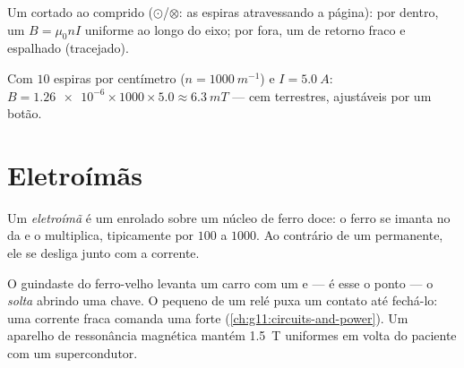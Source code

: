 \begin{omfigure}

{\small Um  cortado ao comprido ($\odot$/$\otimes$: as espiras
atravessando a página): por dentro, um $B = \mu_0 n I$ uniforme ao longo
do eixo; por fora, um  de retorno fraco e espalhado (tracejado).}
\end{omfigure}

\begin{example}\label{ex:g11:magnetic-fields:solenoid}
Com $10$ espiras por centímetro ($n = \qty{1000}{m^{-1}}$) e
$I = \qty{5.0}{A}$:
$B = \num{1.26e-6} \times 1000 \times 5.0 \approx \qty{6.3}{mT}$ --- cem
 terrestres, ajustáveis por um botão.
\end{example}

\section{Eletroímãs}

\begin{definition}[Eletroímã]\label{def:g11:magnetic-fields:electromagnet}
Um \emph{eletroímã} é um  enrolado sobre um
núcleo de ferro doce: o ferro se imanta no  da  e o
multiplica, tipicamente por $100$ a $1000$. Ao contrário de um 
permanente, ele se desliga junto com a corrente.
\end{definition}

\begin{remark}\label{rem:g11:magnetic-fields:machines}
O guindaste do ferro-velho levanta um carro com um  e --- é esse
o ponto --- o \emph{solta} abrindo uma chave. O pequeno  de um
relé puxa um contato até fechá-lo: uma corrente fraca comanda uma forte
(\cref{ch:g11:circuits-and-power}). Um aparelho de ressonância magnética
mantém \qty{1.5}{T} uniformes em volta do paciente com um 
supercondutor.
\end{remark}

